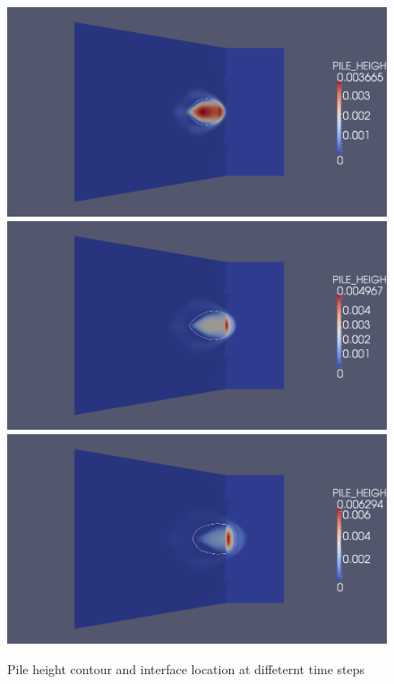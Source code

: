 \documentclass[letterpaper,10pt]{article}
\begin{document}
\begin{figure}[H]
\begin{minipage}[b]{.5\linewidth}
  \end{minipage}
  \begin{minipage}[b]{.5\linewidth}
    \centering
    \includegraphics[width=1\textwidth]{IMAGES/phase_field/4.png}
    \includegraphics[width=1\textwidth]{IMAGES/phase_field/5.png}
    \includegraphics[width=1\textwidth]{IMAGES/phase_field/6.png}
  \end{minipage}
  \caption{Pile height contour and interface location at diffeternt time steps}
  \label{Phase field1}
\end{figure}
\end{document}
